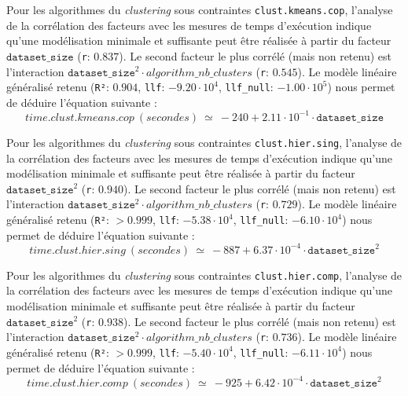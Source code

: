 			Pour les algorithmes du \textit{clustering} sous contraintes \texttt{clust.kmeans.cop}, l'analyse de la corrélation des facteurs avec les mesures de temps d'exécution indique qu'une modélisation minimale et suffisante peut être réalisée à partir du facteur $\texttt{dataset\_size}$ (\texttt{r}: $0.837$).
			Le second facteur le plus corrélé (mais non retenu) est l'interaction $\texttt{dataset\_size}^{2} \cdot algorithm\_nb\_clusters$ (\texttt{r}: $0.545$).
			Le modèle linéaire généralisé retenu (\texttt{R²}: $0.904$, \texttt{llf}: $-9.20 \cdot 10^{4}$, \texttt{llf\_null}: $-1.00 \cdot 10^{5}$) nous permet de déduire l'équation suivante :
			\begin{equation}
				time.clust.kmeans.cop~(secondes)~
				\simeq~-240 + 2.11 \cdot 10^{-1} \cdot \texttt{dataset\_size}
			\end{equation}
			
			Pour les algorithmes du \textit{clustering} sous contraintes \texttt{clust.hier.sing}, l'analyse de la corrélation des facteurs avec les mesures de temps d'exécution indique qu'une modélisation minimale et suffisante peut être réalisée à partir du facteur $\texttt{dataset\_size}^{2}$ (\texttt{r}: $0.940$).
			Le second facteur le plus corrélé (mais non retenu) est l'interaction $\texttt{dataset\_size}^{2} \cdot algorithm\_nb\_clusters$ (\texttt{r}: $0.729$).
			Le modèle linéaire généralisé retenu (\texttt{R²}: $> 0.999$, \texttt{llf}: $-5.38 \cdot 10^{4}$, \texttt{llf\_null}: $-6.10 \cdot 10^{4}$) nous permet de déduire l'équation suivante :
			\begin{equation}
				time.clust.hier.sing~(secondes)~
				\simeq~-887 + 6.37 \cdot 10^{-4} \cdot \texttt{dataset\_size}^{2}
			\end{equation}
			
			Pour les algorithmes du \textit{clustering} sous contraintes \texttt{clust.hier.comp}, l'analyse de la corrélation des facteurs avec les mesures de temps d'exécution indique qu'une modélisation minimale et suffisante peut être réalisée à partir du facteur $\texttt{dataset\_size}^{2}$ (\texttt{r}: $0.938$).
			Le second facteur le plus corrélé (mais non retenu) est l'interaction $\texttt{dataset\_size}^{2} \cdot algorithm\_nb\_clusters$ (\texttt{r}: $0.736$).
			Le modèle linéaire généralisé retenu (\texttt{R²}: $> 0.999$, \texttt{llf}: $-5.40 \cdot 10^{4}$, \texttt{llf\_null}: $-6.11 \cdot 10^{4}$) nous permet de déduire l'équation suivante :
			\begin{equation}
				time.clust.hier.comp~(secondes)~
				\simeq~-925 + 6.42 \cdot 10^{-4} \cdot \texttt{dataset\_size}^{2}
			\end{equation}

